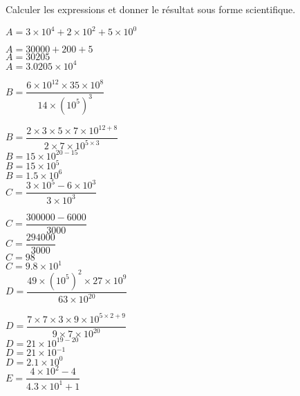 \begin{corrige}
    Calculer les expressions et donner le résultat sous forme scientifique.
    \begin{spacing}{2}
        \begin{itemize}
            \def\item{}
            \item $A = 3\times 10^4 + 2\times 10^2 + 5\times 10^0$
            
            {\red
            $A = \num{30000} + 200 + 5$\\
            $A = \num{30205}$\\
            $A = \num{3.0205}\times 10^4$\\
            }
        \end{itemize}
    \end{spacing}
        \Coupe
    \begin{spacing}{2}
        \begin{itemize}
            \def\item{}
            \item $B=\dfrac{6\times 10^{12}\times 35 \times 10^8}{14\times \left(10^5\right)^3}$
            
            {\red
                $B=\dfrac{2\times 3\times 5\times 7\times 10^{12+8}}{2\times 7\times 10^{5\times 3}}$\\
                $B=15\times 10^{20-15}$\\
                $B=15\times 10^{5}$\\
                $B=\num{1.5}\times 10^{6}$\\
            }
            \item $C=\dfrac{3\times 10^{5} - 6 \times 10^3}{3\times 10^3}$
            
            {\red
                $C=\dfrac{\num{300000} - \num{6000}}{\num{3000}}$\\
                $C=\dfrac{\num{294000}}{\num{3000}}$\\
                $C=98$\\
                $C=\num{9.8}\times 10^1$\\
            }
            \item $D=\dfrac{49\times (10^{5})^2\times 27 \times 10^9}{63\times 10^{20}}$
            
            {\red
                $D=\dfrac{7\times 7\times 3\times 9 \times 10^{5\times 2 + 9}}{9\times 7\times 10^{20}}$\\
                $D=21\times 10^{19-20}$\\
                $D=21\times 10^{-1}$\\
                $D=\num{2.1}\times 10^{0}$\\
            }
            \item $E=\dfrac{4\times 10^{2} -4}{\num{4.3}\times 10^1 + 1}$
            

\end{itemize}
\end{spacing}
\end{corrige}
